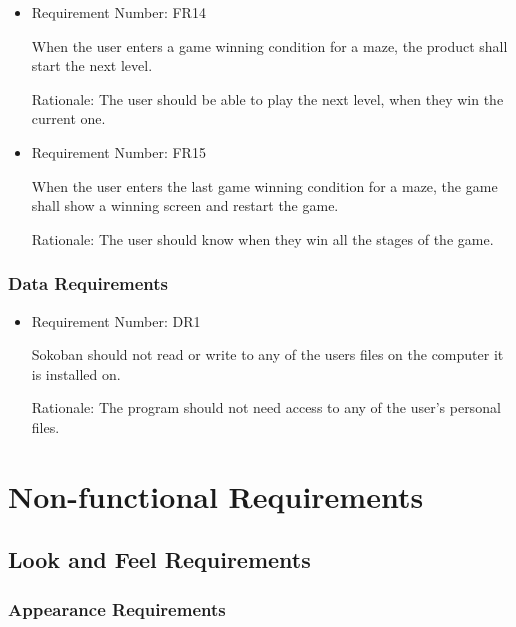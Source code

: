\documentclass[12pt, titlepage]{article}
\begin{document}
\begin{itemize}
\item Requirement Number: FR14

When the user enters a game winning condition for a maze, the product shall start the next level.

Rationale: The user should be able to play the next level, when they win the current one.

\item Requirement Number: FR15

When the user enters the last game winning condition for a maze, the game shall show a winning screen and restart the game.

Rationale: The user should know when they win all the stages of the game.

\end{itemize}

\subsubsection{Data Requirements}

\begin{itemize}
    \item Requirement Number: DR1

Sokoban should not read or write to any of the users files on the computer it is installed on.

Rationale: The program should not need access to any of the user's personal files.

\end{itemize}

\section{Non-functional Requirements}

\subsection{Look and Feel Requirements}
\subsubsection{Appearance Requirements}
\end{document}

